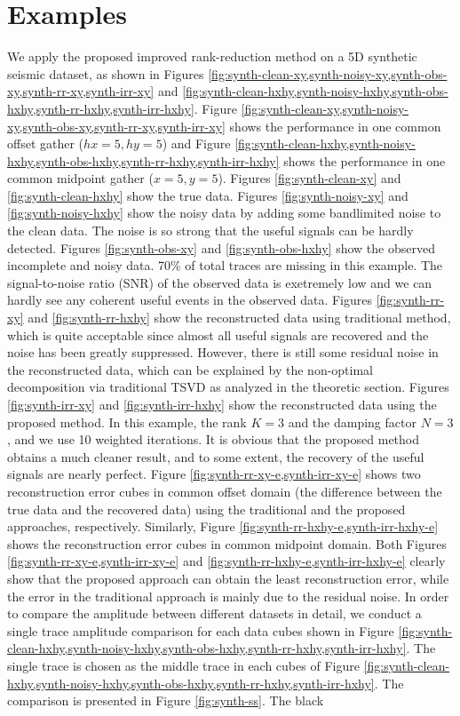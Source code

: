 \section{Examples}
We apply the proposed improved rank-reduction method on a 5D synthetic seismic dataset, as shown in Figures \ref{fig:synth-clean-xy,synth-noisy-xy,synth-obs-xy,synth-rr-xy,synth-irr-xy} and \ref{fig:synth-clean-hxhy,synth-noisy-hxhy,synth-obs-hxhy,synth-rr-hxhy,synth-irr-hxhy}. Figure \ref{fig:synth-clean-xy,synth-noisy-xy,synth-obs-xy,synth-rr-xy,synth-irr-xy} shows the performance in one common offset gather ($hx=5,hy=5$) and Figure \ref{fig:synth-clean-hxhy,synth-noisy-hxhy,synth-obs-hxhy,synth-rr-hxhy,synth-irr-hxhy} shows the performance in one common midpoint gather ($x=5,y=5$). Figures \ref{fig:synth-clean-xy} and \ref{fig:synth-clean-hxhy} show the true data. Figures \ref{fig:synth-noisy-xy} and \ref{fig:synth-noisy-hxhy} show the noisy data by adding some bandlimited noise to the clean data. The noise is so strong that the useful signals can be hardly detected. Figures \ref{fig:synth-obs-xy} and \ref{fig:synth-obs-hxhy} show the observed incomplete and noisy data. 70\% of total traces are missing in this example. The signal-to-noise ratio (SNR) of the observed data is exetremely low and we can hardly see any coherent useful events in the observed data. Figures \ref{fig:synth-rr-xy} and \ref{fig:synth-rr-hxhy} show the reconstructed data using traditional method, which is quite acceptable since almost all useful signals are recovered and the noise has been greatly suppressed. However, there is still some residual noise in the reconstructed data, which can be explained by the non-optimal decomposition via traditional TSVD as analyzed in the theoretic section. Figures \ref{fig:synth-irr-xy} and \ref{fig:synth-irr-hxhy} show the reconstructed data using the proposed method. In this example, the rank $K=3$ and the damping factor $N=3$, and we use 10 weighted  iterations. It is obvious that the proposed method obtains a much cleaner result, and to some extent, the recovery of the useful signals are nearly perfect.  Figure \ref{fig:synth-rr-xy-e,synth-irr-xy-e} shows two reconstruction error cubes in common offset domain (the difference between the true data and the recovered data) using the traditional and the proposed approaches, respectively. Similarly, Figure \ref{fig:synth-rr-hxhy-e,synth-irr-hxhy-e} shows the reconstruction error cubes in common midpoint domain. Both Figures \ref{fig:synth-rr-xy-e,synth-irr-xy-e} and \ref{fig:synth-rr-hxhy-e,synth-irr-hxhy-e} clearly show that the proposed approach can obtain the least reconstruction error, while the error in the traditional approach is mainly due to the residual noise. In order to compare the amplitude between different datasets in detail, we conduct a single trace amplitude comparison for each data cubes shown in Figure \ref{fig:synth-clean-hxhy,synth-noisy-hxhy,synth-obs-hxhy,synth-rr-hxhy,synth-irr-hxhy}. The single trace is chosen as the middle trace in each cubes of Figure \ref{fig:synth-clean-hxhy,synth-noisy-hxhy,synth-obs-hxhy,synth-rr-hxhy,synth-irr-hxhy}. The comparison is presented in Figure \ref{fig:synth-ss}. The black
